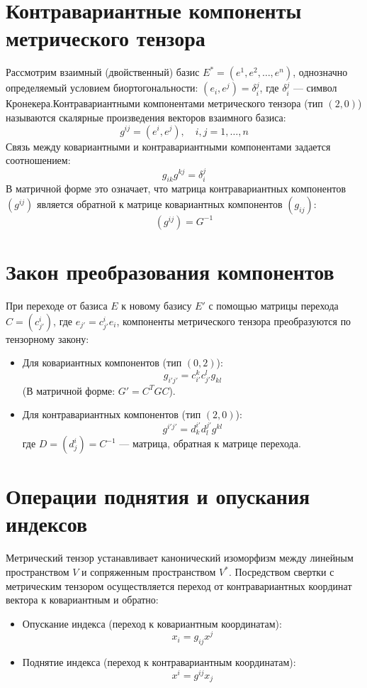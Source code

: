 \documentclass[14pt]{extreport}
\begin{document}
    \section{Контравариантные компоненты метрического тензора}
    Рассмотрим взаимный (двойственный) базис $E^* = (e^1, e^2, \dots, e^n)$, однозначно определяемый условием биортогональности: $(e_i, e^j) = \delta_i^j$, где $\delta_i^j$ — символ Кронекера.Контравариантными компонентами метрического тензора (тип $(2,0)$) называются скалярные произведения векторов взаимного базиса:$$g^{ij} = (e^i, e^j), \quad i, j = 1, \dots, n$$Связь между ковариантными и контравариантными компонентами задается соотношением:$$g_{ik} g^{kj} = \delta_i^j$$В матричной форме это означает, что матрица контравариантных компонентов $(g^{ij})$ является обратной к матрице ковариантных компонентов $(g_{ij})$:$$(g^{ij}) = G^{-1}$$

    \section{Закон преобразования компонентов}

    При переходе от базиса $E$ к новому базису $E'$ с помощью матрицы перехода $C = (c_{j'}^i)$, где $e_{j'} = c_{j'}^i e_i$, компоненты метрического тензора преобразуются по тензорному закону:

    \begin{itemize}
        \item Для ковариантных компонентов (тип $(0,2)$):$$g_{i'j'} = c_{i'}^k c_{j'}^l g_{kl}$$(В матричной форме: $G' = C^T G C$).
        \item Для контравариантных компонентов (тип $(2,0)$):$$g^{i'j'} = d_k^{i'} d_l^{j'} g^{kl}$$где $D = (d_j^i) = C^{-1}$ — матрица, обратная к матрице перехода.
    \end{itemize}

    \section{Операции поднятия и опускания индексов}
    Метрический тензор устанавливает канонический изоморфизм между линейным пространством $V$ и сопряженным пространством $V^*$. Посредством свертки с метрическим тензором осуществляется переход от контравариантных координат вектора к ковариантным и обратно:

    \begin{itemize}
        \item Опускание индекса (переход к ковариантным координатам):$$x_i = g_{ij} x^j$$
        \item Поднятие индекса (переход к контравариантным координатам):$$x^i = g^{ij} x_j$$
    \end{itemize}
\end{document}
